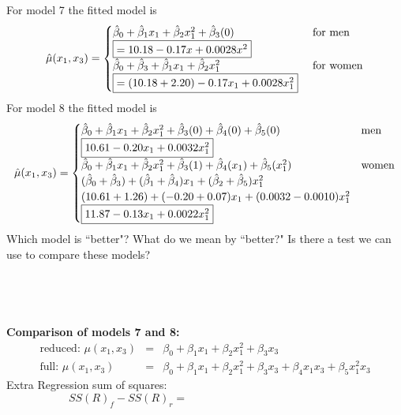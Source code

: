 For model 7 the fitted model is
\[
\hat{\mu}(x_1,x_3)=\begin{cases}  
\hat{\beta}_0 + \hat{\beta}_1 x_1 + \hat{\beta}_2 x_1^2 + \hat{\beta}_3 (0)
& \text{ for men} \\
\fbox{$=10.18 - 0.17 x +0.0028 x^2$} & \\
\hat{\beta}_0 + \hat{\beta}_3+\hat{\beta}_1 x_1 + \hat{\beta}_2 x_1^2
& \text{ for women} \\
\fbox{$=(10.18 + 2.20) - 0.17 x_1 +0.0028 x_1^2$} & \\
\end{cases}
\]
For model 8 the fitted model is
\[
\hat{\mu}(x_1,x_3)=\begin{cases} 
\hat{\beta}_0 + \hat{\beta}_1 x_1 + \hat{\beta}_2 x_1^2 + \hat{\beta}_3 (0) + \hat{\beta}_4(0) + \hat{\beta}_5(0)
& \text{men} \\
\fbox{$10.61 - 0.20 x_1 +0.0032 x_1^2$} & \\
\hat{\beta}_0 + \hat{\beta}_1 x_1 + \hat{\beta}_2 x_1^2 + \hat{\beta}_3 (1) + \hat{\beta}_4 (x_1) + \hat{\beta}_5(x_1^2) & \text{women} \\ 
(\hat{\beta}_0 + \hat{\beta}_3) + (\hat{\beta}_1 + \hat{\beta}_4)x_1 + (\hat{\beta}_2 + \hat{\beta}_5)x_1^2 & \\
(10.61 + 1.26) + (-0.20 +0.07) x_1 + (0.0032 -0.0010) x_1^2  & \\
\fbox{$11.87 - 0.13 x_1 + 0.0022  x_1^2$}  & \\
\end{cases}
\]
Which model is ``better"?  What do we mean by ``better?"  Is there a test we can use to compare these models?\\~\\~\\~\\~\\

\textbf{Comparison of models 7 and 8:}\\
\begin{eqnarray*}
\text{reduced:  } \mu(x_1,x_3) &=& \beta_0 + \beta_1 x_1+ \beta_2 x_1^2+ \beta_3 x_3  \\
\text{full:  } \mu(x_1,x_3) &=& \beta_0 + \beta_1 x_1+ \beta_2 x_1^2+ \beta_3 x_3 + \beta_4 x_1x_3 + \beta_5 x_1^2 x_3
\end{eqnarray*}
Extra Regression sum of squares: 
$$SS(R)_f - SS(R)_r = ~~~~~~~~~~~~~~~~~~~~~~~~~~~~~~~~~~~~~~~~~~~~~~~~~~~~~~~~~~~~~~~$$

